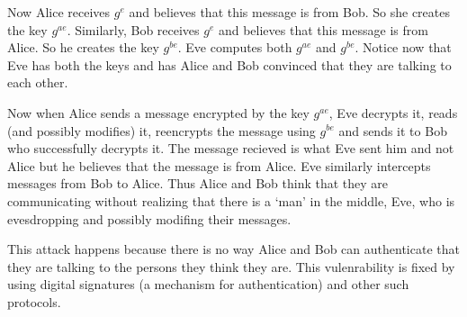 \documentclass[letterpaper,12pt]{article}
\theoremstyle{remark}
\begin{document}
Now Alice receives $g^e$ and believes that this message is from Bob. So she creates the key $g^{ae}$. Similarly, Bob receives $g^e$ and believes that this message is from Alice. So he creates the key $g^{be}$. Eve computes both $g^{ae}$ and $g^{be}$. Notice now that Eve has both the keys and has Alice and Bob convinced that they are talking to each other. 

Now when Alice sends a message encrypted by the key $g^{ae}$, Eve decrypts it, reads (and possibly modifies) it, reencrypts the message using $g^{be}$ and sends it to Bob who successfully decrypts it. The message recieved is what Eve sent him and not Alice but he believes that the message is from Alice. Eve similarly intercepts messages from Bob to Alice. Thus Alice and Bob think that they are communicating without realizing that there is a `man' in the middle, Eve, who is evesdropping and possibly modifing their messages.

This attack happens because there is no way Alice and Bob can authenticate that they are talking to the persons they think they are. This vulenrability is fixed by using digital signatures (a mechanism for authentication) and other such protocols. 
\end{document}
